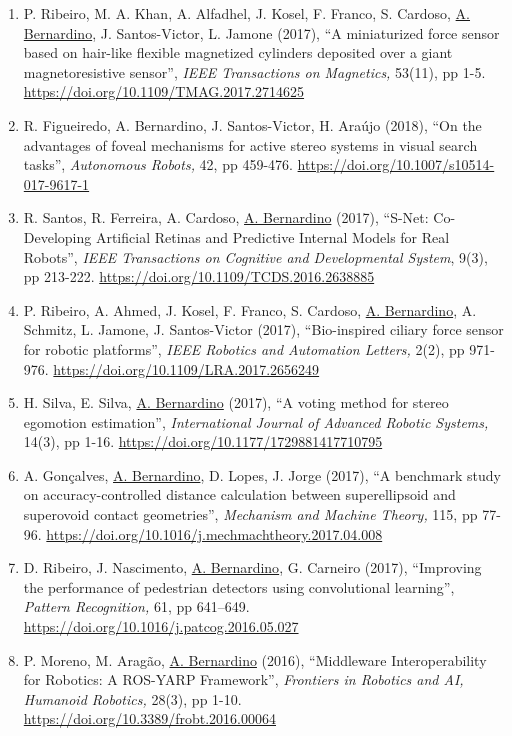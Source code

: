 \begin{enumerate}
\item
  P. Ribeiro, M. A. Khan, A. Alfadhel, J. Kosel, F. Franco, S. Cardoso,
  \ul{A. Bernardino}, J. Santos-Victor, L. Jamone (2017), ``A
  miniaturized force sensor based on hair-like flexible magnetized
  cylinders deposited over a giant magnetoresistive sensor'', \emph{IEEE
  Transactions on Magnetics,} 53(11), pp 1-5.
  \url{https://doi.org/10.1109/TMAG.2017.2714625}~
\item
  R. Figueiredo, A. Bernardino, J. Santos-Victor, H. Araújo (2018), ``On
  the advantages of foveal mechanisms for active stereo systems in
  visual search tasks'', \emph{Autonomous Robots,} 42, pp 459-476.
  \url{https://doi.org/10.1007/s10514-017-9617-1}~
\item
  R. Santos, R. Ferreira, A. Cardoso, \ul{A. Bernardino} (2017),
  ``S-Net: Co-Developing Artificial Retinas and Predictive Internal
  Models for Real Robots'', \emph{IEEE Transactions on Cognitive and
  Developmental System}, 9(3), pp 213-222.
  \url{https://doi.org/10.1109/TCDS.2016.2638885}~
\item
  P. Ribeiro, A. Ahmed, J. Kosel, F. Franco, S. Cardoso, \ul{A.
  Bernardino}, A. Schmitz, L. Jamone, J. Santos-Victor (2017),
  ``Bio-inspired ciliary force sensor for robotic platforms'',
  \emph{IEEE Robotics and Automation Letters,} 2(2), pp 971-976.
  \url{https://doi.org/10.1109/LRA.2017.2656249}~
\item
  H. Silva, E. Silva, \ul{A. Bernardino} (2017), ``A voting method for
  stereo egomotion estimation'', \emph{International Journal of Advanced
  Robotic Systems,} 14(3), pp 1-16.
  \url{https://doi.org/10.1177/1729881417710795}~
\item
  A. Gonçalves, \ul{A. Bernardino}, D. Lopes, J. Jorge (2017), ``A
  benchmark study on accuracy-controlled distance calculation between
  superellipsoid and superovoid contact geometries'', \emph{Mechanism
  and Machine Theory,} 115, pp 77-96.
  \url{https://doi.org/10.1016/j.mechmachtheory.2017.04.008}~
\item
  D. Ribeiro, J. Nascimento, \ul{A. Bernardino}, G. Carneiro (2017),
  ``Improving the performance of pedestrian detectors using
  convolutional learning'', \emph{Pattern Recognition,} 61, pp 641--649.
  \url{https://doi.org/10.1016/j.patcog.2016.05.027}
\item
  P. Moreno, M. Aragão, \ul{A. Bernardino} (2016), ``Middleware
  Interoperability for Robotics: A ROS-YARP Framework'', \emph{Frontiers
  in Robotics and AI, Humanoid Robotics,} 28(3), pp 1-10.
  \url{https://doi.org/10.3389/frobt.2016.00064}~

\end{enumerate}
